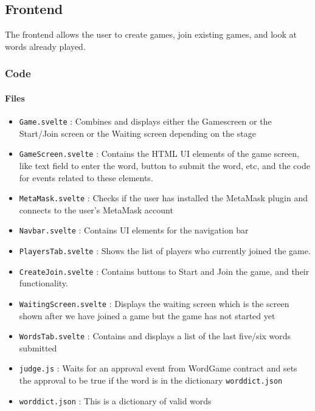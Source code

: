 \documentclass{article}
\begin{document}

\subsection{Frontend}

The frontend allows the user to create games, join existing games, and look at words already played. 




\subsubsection{Code}


\paragraph{Files}

\begin{itemize}
    \item \verb|Game.svelte| :  Combines and displays either the Gamescreen or the Start/Join screen or the Waiting screen depending on the stage  
    \item \verb|GameScreen.svelte| : Contains the HTML UI elements of the game screen, like text field to enter the word, button to submit the word, etc, and the code for events related to these elements. 
    \item \verb|MetaMask.svelte| : Checks if the user has installed the MetaMask plugin and connects to the user's MetaMask account
    \item \verb|Navbar.svelte| : Contains UI elements for the navigation bar
    \item \verb|PlayersTab.svelte| : Shows the list of players who currently joined the game.
    \item \verb|CreateJoin.svelte| : Contains buttons to Start and Join the game, and their functionality. 
    \item \verb|WaitingScreen.svelte| : Displays the waiting screen which is the screen shown after we have joined a game but the game has not started yet
    \item \verb|WordsTab.svelte| : Contains and displays a list of the last five/six
    words submitted
    \item \verb|judge.js| : Waits for an approval event from WordGame contract and sets the approval to be true if the word is in the dictionary \verb|worddict.json|
    \item \verb|worddict.json| : This is a dictionary of valid words
\end{itemize}
\end{document}
